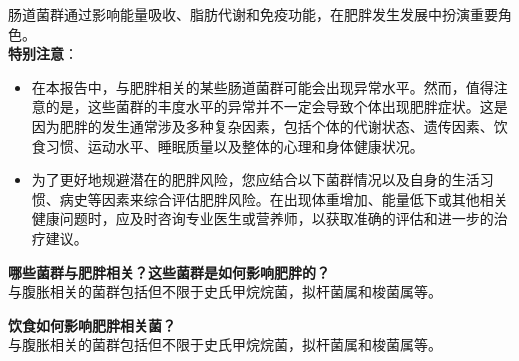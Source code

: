 \documentclass[UTF8]{ctexart}
\begin{document}
\begin{tcolorbox}[
    enhanced,
    colback=customTealBg,
    colframe=customTealBg,
    arc=3mm,
    boxrule=0pt,
    width=\textwidth,
    top=8pt,
    bottom=8pt
]
{\small{\color{customTeal}\faInfoCircle}
肠道菌群通过影响能量吸收、脂肪代谢和免疫功能，在肥胖发生发展中扮演重要角色。\\

{\color{orange}\faExclamationTriangle} \textbf{特别注意}：
\begin{itemize}
    \item 在本报告中，与肥胖相关的某些肠道菌群可能会出现异常水平。然而，值得注意的是，这些菌群的丰度水平的异常并不一定会导致个体出现肥胖症状。这是因为肥胖的发生通常涉及多种复杂因素，包括个体的代谢状态、遗传因素、饮食习惯、运动水平、睡眠质量以及整体的心理和身体健康状况。 \item 为了更好地规避潜在的肥胖风险，您应结合以下菌群情况以及自身的生活习惯、病史等因素来综合评估肥胖风险。在出现体重增加、能量低下或其他相关健康问题时，应及时咨询专业医生或营养师，以获取准确的评估和进一步的治疗建议。
\end{itemize}
}
\end{tcolorbox}

\begin{tcolorbox}[
    enhanced,
    colback=lightpurple!10, %
    colframe=lightpurple!10,  %
    arc=3mm,
    boxrule=0.5pt,
    width=\textwidth,
    top=8pt,
    bottom=8pt
]
{\small{\color{lightpurple}\faQuestionCircle}\quad \textbf{哪些菌群与肥胖相关？这些菌群是如何影响肥胖的？}\\
{\color{orange!50}\faComments}\quad 与腹胀相关的菌群包括但不限于史氏甲烷烷菌，拟杆菌属和梭菌属等。
}
\end{tcolorbox}

\begin{tcolorbox}[
    enhanced,
    colback=lightpurple!10, %
    colframe=lightpurple!10,  %
    arc=3mm,
    boxrule=0.5pt,
    width=\textwidth,
    top=8pt,
    bottom=8pt
]
{\small{\color{lightpurple}\faQuestionCircle}\quad \textbf{饮食如何影响肥胖相关菌？}\\
{\color{orange!50}\faComments}\quad 与腹胀相关的菌群包括但不限于史氏甲烷烷菌，拟杆菌属和梭菌属等。
}
\end{tcolorbox}

\newpage
\end{document}
